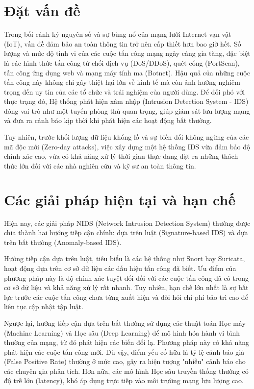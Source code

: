 \documentclass[../DoAn.tex]{subfiles}
\begin{document}
\section{Đặt vấn đề}
Trong bối cảnh kỷ nguyên số và sự bùng nổ của mạng lưới Internet vạn vật (IoT), vấn đề đảm bảo an toàn thông tin trở nên cấp thiết hơn bao giờ hết. Số lượng và mức độ tinh vi của các cuộc tấn công mạng ngày càng gia tăng, đặc biệt là các hình thức tấn công từ chối dịch vụ (DoS/DDoS), quét cổng (PortScan), tấn công ứng dụng web và mạng máy tính ma (Botnet). Hậu quả của những cuộc tấn công này không chỉ gây thiệt hại lớn về kinh tế mà còn ảnh hưởng nghiêm trọng đến uy tín của các tổ chức và trải nghiệm của người dùng. Để đối phó với thực trạng đó, Hệ thống phát hiện xâm nhập (Intrusion Detection System - IDS) đóng vai trò như một tuyến phòng thủ quan trọng, giúp giám sát lưu lượng mạng và đưa ra cảnh báo kịp thời khi phát hiện các hoạt động bất thường.

Tuy nhiên, trước khối lượng dữ liệu khổng lồ và sự biến đổi không ngừng của các mã độc mới (Zero-day attacks), việc xây dựng một hệ thống IDS vừa đảm bảo độ chính xác cao, vừa có khả năng xử lý thời gian thực đang đặt ra những thách thức lớn đối với các nhà nghiên cứu và kỹ sư an toàn thông tin.

\section{Các giải pháp hiện tại và hạn chế}
Hiện nay, các giải pháp NIDS (Network Intrusion Detection System) thường được chia thành hai hướng tiếp cận chính: dựa trên luật (Signature-based IDS) và dựa trên bất thường (Anomaly-based IDS).

Hướng tiếp cận dựa trên luật, tiêu biểu là các hệ thống như Snort hay Suricata, hoạt động dựa trên cơ sở dữ liệu các dấu hiệu tấn công đã biết. Ưu điểm của phương pháp này là độ chính xác tuyệt đối đối với các cuộc tấn công đã có trong cơ sở dữ liệu và khả năng xử lý rất nhanh. Tuy nhiên, hạn chế lớn nhất là sự bất lực trước các cuộc tấn công chưa từng xuất hiện và đòi hỏi chi phí bảo trì cao để liên tục cập nhật tập luật.

Ngược lại, hướng tiếp cận dựa trên bất thường sử dụng các thuật toán Học máy (Machine Learning) và Học sâu (Deep Learning) để mô hình hóa hành vi bình thường của mạng, từ đó phát hiện các biến đổi lạ. Phương pháp này có khả năng phát hiện các cuộc tấn công mới. Dù vậy, điểm yếu cố hữu là tỷ lệ cảnh báo giả (False Positive Rate) thường ở mức cao, gây ra hiện tượng "nhiễu" cảnh báo cho các chuyên gia phân tích. Hơn nữa, các mô hình Học sâu truyền thống thường có độ trễ lớn (latency), khó áp dụng trực tiếp vào môi trường mạng lưu lượng cao.
\end{document}
